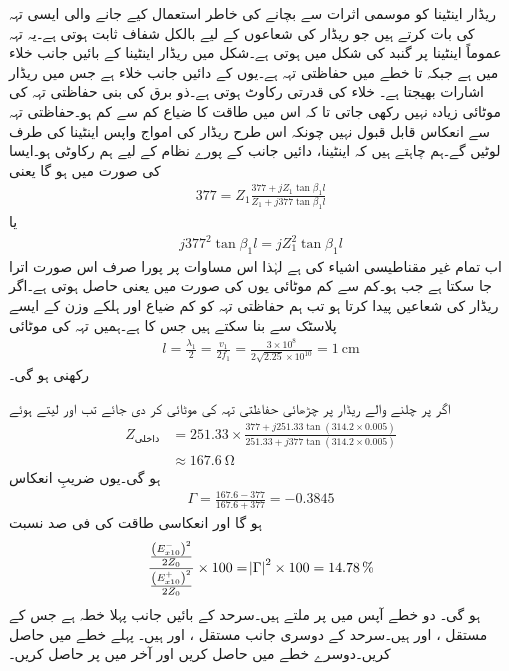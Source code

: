  ریڈار اینٹینا کو موسمی اثرات سے بچانے کی خاطر استعمال کیے جانے والی ایسی تہہ کی بات کرتے ہیں جو ریڈار کی شعاعوں کے لیے بالکل شفاف ثابت ہوتی ہے۔یہ تہہ عموماً اینٹینا پر گنبد کی شکل میں ہوتی ہے۔شکل  میں ریڈار اینٹینا  کے بائیں جانب خلاء میں ہے جبکہ  تا  خطے میں حفاظتی تہہ ہے۔یوں  کے دائیں جانب خلاء ہے جس میں ریڈار اشارات بھیجتا ہے۔ خلاء کی قدرتی رکاوٹ  ہوتی ہے۔ذو برق کی بنی حفاظتی تہہ کی موٹائی زیادہ نہیں رکھی جاتی تا کہ اس میں طاقت کا ضیاع کم سے کم ہو۔حفاظتی تہہ سے انعکاس قابل قبول نہیں چونکہ اس طرح ریڈار کی امواج واپس اینٹینا کی طرف لوٹیں گے۔ہم چاہتے ہیں کہ اینٹینا، دائیں جانب کے پورے نظام کے لیے ہم رکاوٹی ہو۔ایسا  کی صورت میں ہو گا یعنی
\begin{align*}
377=Z_1 \frac{377+jZ_1 \tan \beta_1 l}{Z_1+j 377 \tan \beta_1 l}
\end{align*}
یا
\begin{align*}
j 377^2 \tan \beta_1 l =j Z_1^2 \tan \beta_1 l
\end{align*}
اب تمام غیر مقناطیسی اشیاء کی  ہے لہٰذا اس مساوات پر پورا صرف اس صورت اترا جا سکتا ہے جب  ہو۔کم سے کم موٹائی یوں  کی صورت میں  یعنی  حاصل ہوتی ہے۔اگر ریڈار  کی شعاعیں پیدا کرتا ہو تب ہم حفاظتی تہہ کو کم ضیاع اور ہلکے وزن کے ایسے  پلاسٹک  سے بنا سکتے ہیں جس کا  ہے۔ہمیں تہہ کی موٹائی
\begin{align*}
l=\frac{\lambda_1}{2}=\frac{v_1}{2 f_1}=\frac{3\times 10^8}{2 \sqrt{2.25} \times 10^{10}}=\SI{1}{\centi\meter}
\end{align*}
رکھنی ہو گی۔

اگر  پر چلنے والے ریڈار پر چڑھائی حفاظتی تہہ کی موٹائی  کر دی جائے تب  اور  لیتے ہوئے
\begin{align*}
Z_{\text{داخلی}}&=251.33 \times \frac{377+j 251.33 \tan (314.2 \times 0.005)}{251.33+j 377 \tan(314.2\times 0.005)}\\
&\approx \SI{167.6}{\ohm}
\end{align*}
ہو گی۔یوں ضریبِ انعکاس
\begin{align*}
\Gamma=\frac{167.6-377}{167.6+377}=-0.3845
\end{align*}
ہو گا اور انعکاسی طاقت کی فی صد نسبت
\begin{align*}
\frac{\frac{\left(E_{x10}^-\right)^2}{2Z_0}}{\frac{\left(E_{x10}^+\right)^2}{2Z_0}} \times 100=\abs{\Gamma}^2 \times 100=\SI{14.78}{\%}
\end{align*}
ہو گی۔
دو خطے آپس میں  پر ملتے ہیں۔سرحد کے بائیں جانب پہلا خطہ ہے جس کے مستقل ،  اور  ہیں۔سرحد کے دوسری جانب مستقل ،  اور  ہیں۔ پہلے خطے میں  حاصل کریں۔دوسرے خطے میں  حاصل کریں اور آخر میں  پر  حاصل کریں۔


